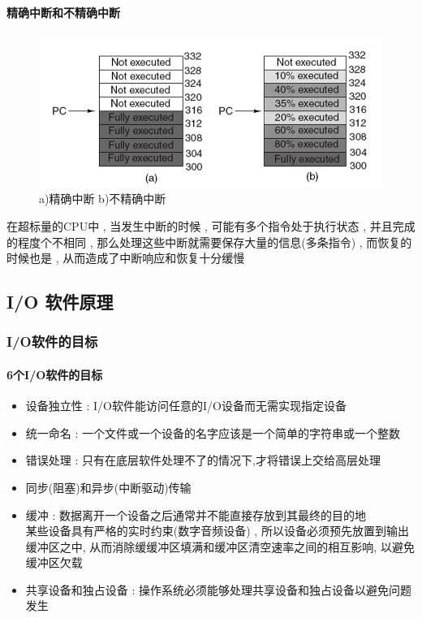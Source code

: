 \documentclass[UTF8,a4paper]{ctexart}
\begin{document}
\paragraph{精确中断和不精确中断}
\begin{figure}[H]
	\centering
	\includegraphics[scale = 0.5]{assets/ModernOperatingSystems/2018-01-10-16-14-02.png}
	\caption{a)精确中断 b)不精确中断}
\end{figure}

在超标量的CPU中 , 当发生中断的时候 , 可能有多个指令处于执行状态 , 并且完成的程度个不相同 , 那么处理这些中断就需要保存大量的信息(多条指令) , 而恢复的时候也是 , 从而造成了中断响应和恢复十分缓慢

\subsection{I/O 软件原理}

\subsubsection{I/O软件的目标}
\paragraph{6个I/O软件的目标} 
\begin{itemize}
	\item 设备独立性 : I/O软件能访问任意的I/O设备而无需实现指定设备
	\item 统一命名 : 一个文件或一个设备的名字应该是一个简单的字符串或一个整数
	\item 错误处理 : 只有在底层软件处理不了的情况下,才将错误上交给高层处理
	\item 同步(阻塞)和异步(中断驱动)传输 
	\item 缓冲 : 数据离开一个设备之后通常并不能直接存放到其最终的目的地\\
	某些设备具有严格的实时约束(数字音频设备) , 所以设备必须预先放置到输出缓冲区之中, 从而消除缓缓冲区填满和缓冲区清空速率之间的相互影响, 以避免缓冲区欠载
	\item 共享设备和独占设备 : 操作系统必须能够处理共享设备和独占设备以避免问题发生
\end{itemize}
\end{document}
